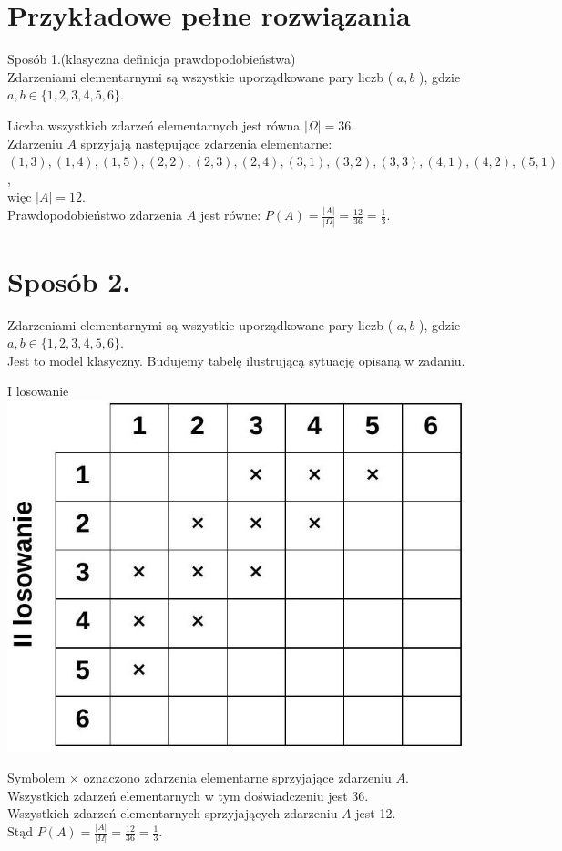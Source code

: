 \documentclass[10pt]{article}
\begin{document}
\section*{Przykładowe pełne rozwiązania}
Sposób 1.(klasyczna definicja prawdopodobieństwa)\\
Zdarzeniami elementarnymi są wszystkie uporządkowane pary liczb ( $a, b$ ), gdzie $a, b \in\{1,2,3,4,5,6\}$.

Liczba wszystkich zdarzeń elementarnych jest równa $|\Omega|=36$.\\
Zdarzeniu $A$ sprzyjają następujące zdarzenia elementarne:\\
$(1,3),(1,4),(1,5),(2,2),(2,3),(2,4),(3,1),(3,2),(3,3),(4,1),(4,2),(5,1)$,\\
więc $|A|=12$.\\
Prawdopodobieństwo zdarzenia $A$ jest równe: $P(A)=\frac{|A|}{|\Omega|}=\frac{12}{36}=\frac{1}{3}$.

\section*{Sposób 2.}
Zdarzeniami elementarnymi są wszystkie uporządkowane pary liczb ( $a, b$ ), gdzie $a, b \in\{1,2,3,4,5,6\}$.\\
Jest to model klasyczny. Budujemy tabelę ilustrującą sytuację opisaną w zadaniu.

I losowanie\\
\includegraphics[max width=\textwidth, center]{2025_02_07_6828143ce1e2fe8e0865g-24}

Symbolem × oznaczono zdarzenia elementarne sprzyjające zdarzeniu $A$.\\
Wszystkich zdarzeń elementarnych w tym doświadczeniu jest 36.\\
Wszystkich zdarzeń elementarnych sprzyjających zdarzeniu $A$ jest 12.\\
Stąd $P(A)=\frac{|A|}{|\Omega|}=\frac{12}{36}=\frac{1}{3}$.
\end{document}
